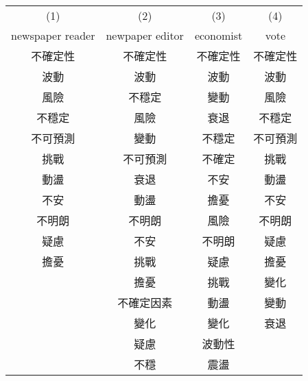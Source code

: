 {
\def\sym#1{\ifmmode^{#1}\else\(^{#1}\)\fi}
\begin{tabular}{c c c c}
\hline\hline

\multicolumn{1}{c}{(1)}
&\multicolumn{1}{c}{(2)}
&\multicolumn{1}{c}{(3)}
&\multicolumn{1}{c}{(4)}
\\

\multicolumn{1}{c}{newspaper reader}
&\multicolumn{1}{c}{newpaper editor}
&\multicolumn{1}{c}{economist}
&\multicolumn{1}{c}{vote}
\\
\hline
不確定性 & 不確定性 & 不確定性 & 不確定性 \\
波動 & 波動 & 波動 & 波動 \\
風險 & 不穩定 & 變動 & 風險 \\
不穩定 & 風險 & 衰退 & 不穩定 \\
不可預測 & 變動 & 不穩定 & 不可預測 \\
挑戰 & 不可預測 & 不確定 & 挑戰 \\
動盪 & 衰退 & 不安 & 動盪 \\
不安 & 動盪 & 擔憂 & 不安 \\
不明朗 & 不明朗 & 風險 & 不明朗 \\
疑慮 & 不安 & 不明朗 & 疑慮 \\
擔憂 & 挑戰 & 疑慮 & 擔憂 \\
 & 擔憂 & 挑戰 &  變化 \\
 & 不確定因素 & 動盪 & 變動 \\
 & 變化 & 變化 & 衰退 \\
 & 疑慮 & 波動性 &  \\
 & 不穩 & 震盪 &  \\
\hline\hline
\end{tabular}
}
